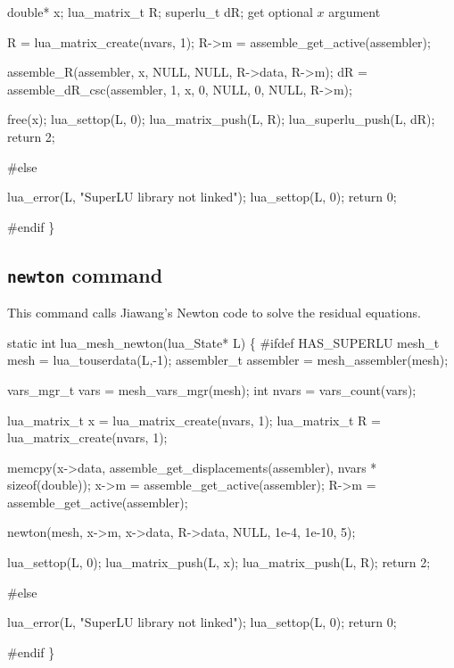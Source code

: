     double*      x;
    lua_matrix_t R;
    superlu_t    dR;
    \LA{}get optional $x$ argument~{\nwtagstyle{}}\RA{}

    R = lua_matrix_create(nvars, 1);
    R->m = assemble_get_active(assembler);

    assemble_R(assembler, x, NULL, NULL, R->data, R->m);
    dR = assemble_dR_csc(assembler, 1, x, 0, NULL, 0, NULL, R->m);

    free(x);
    lua_settop(L, 0);
    lua_matrix_push(L, R);
    lua_superlu_push(L, dR);
    return 2;

#else

    lua_error(L, "SuperLU library not linked");
    lua_settop(L, 0);
    return 0;

#endif
\}

\nwendcode{}\nwdocspar

\subsection{{\tt{}newton} command}

This command calls Jiawang's Newton code to solve the residual equations. %

\nwenddocs{}\plusendmoddef
static int lua_mesh_newton(lua_State* L)
\{
#ifdef HAS_SUPERLU
    mesh_t mesh = lua_touserdata(L,-1);
    assembler_t assembler = mesh_assembler(mesh);

    vars_mgr_t  vars      = mesh_vars_mgr(mesh);
    int         nvars     = vars_count(vars);

    lua_matrix_t x   = lua_matrix_create(nvars, 1);
    lua_matrix_t R   = lua_matrix_create(nvars, 1);

    memcpy(x->data, assemble_get_displacements(assembler), 
           nvars * sizeof(double));
    x->m = assemble_get_active(assembler);
    R->m = assemble_get_active(assembler);

    newton(mesh, x->m, x->data, R->data, NULL,
           1e-4, 1e-10, 5);

    lua_settop(L, 0);
    lua_matrix_push(L, x);
    lua_matrix_push(L, R);
    return 2;

#else

    lua_error(L, "SuperLU library not linked");
    lua_settop(L, 0);
    return 0;

#endif
\}

